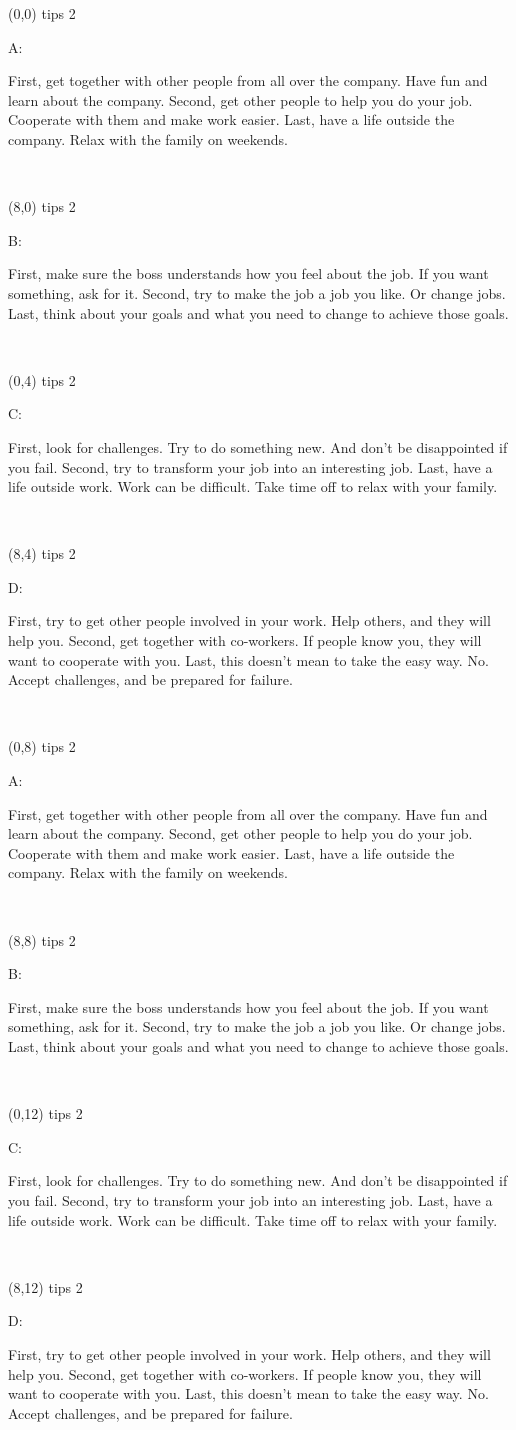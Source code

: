\documentclass[a4paper]{article}
\newcommand{\myIdentifier}[0]{
tips 2
}
\newcommand{\myAcontent}[0]{
First, get together with other people from all over the company. Have fun and learn about the company. Second, get other people to help you do your job. Cooperate with them and make work easier. Last, have a life outside the company. Relax with the family on weekends.
}
\newcommand{\myBcontent}[0]{
First, make sure the boss understands how you feel about the job. If you want something, ask for it. Second, try to make the job a job you like. Or change jobs. Last, think about your goals and what you need to change to achieve those goals.
}
\newcommand{\myCcontent}[0]{
First, look for challenges. Try to do something new. And don't be disappointed if you fail. Second, try to transform your job into an interesting job. Last, have a life outside work. Work can be difficult. Take time off to relax with your family.
}
\newcommand{\myDcontent}[0]{
First, try to get other people involved in your work. Help others, and they will help you. Second, get together with co-workers. If people know you, they will want to cooperate with you. Last, this doesn't mean to take the easy way. No. Accept challenges, and be prepared for failure.
}
\newcommand{\mycard}[5]{%
	\vspace{0.1cm}
	\small #1 #2
	\par
	\parbox[t][6.7cm][c]{9.5cm}{%
	\hspace{0.1cm} \Large#3\\
	\normalsize#4 #5
	}
}
\begin{document}
\selectfont

\begin{textblock}{8}(0,0)
\mycard{}{\myIdentifier}{\parbox{9.0cm}{A:
\myAcontent
}}{}{} 
\end{textblock}

\begin{textblock}{8}(8,0)
\mycard{}{\myIdentifier}{\parbox{9.0cm}{B:
\myBcontent
}}{}{} 
\end{textblock}

\begin{textblock}{8}(0,4)
\mycard{}{\myIdentifier}{\parbox{9.0cm}{C:
\myCcontent
}}{}{} 
\end{textblock}

\begin{textblock}{8}(8,4)
\mycard{}{\myIdentifier}{\parbox{9.0cm}{D:
\myDcontent
}}{}{} 
\end{textblock}

\begin{textblock}{8}(0,8)
\mycard{}{\myIdentifier}{\parbox{9.0cm}{A:
\myAcontent
}}{}{} 
\end{textblock}

\begin{textblock}{8}(8,8)
\mycard{}{\myIdentifier}{\parbox{9.0cm}{B:
\myBcontent
}}{}{} 
\end{textblock}

\begin{textblock}{8}(0,12)
\mycard{}{\myIdentifier}{\parbox{9.0cm}{C:
\myCcontent
}}{}{} 
\end{textblock}

\begin{textblock}{8}(8,12)
\mycard{}{\myIdentifier}{\parbox{9.0cm}{D:
\myDcontent
}}{}{} 
\end{textblock}
\end{document}
